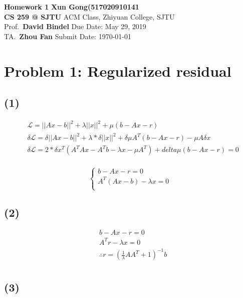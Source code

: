 \documentclass[a4paper]{article}
\begin{document}
\noindent
\large \textbf{Homework 1} \hfill \textbf{Xun Gong(517020910141} \\
\normalsize {\bf CS 259 @ SJTU} \hfill ACM Class, Zhiyuan College, SJTU\\
Prof.~{\bf David Bindel} \hfill Due Date: May 29, 2019\\
TA.~{\bf Zhou Fan} \hfill Submit Date: \today

\section*{Problem 1: Regularized residual}

\subsection*{(1)}

\begin{align*}
&\mathcal{L} = ||Ax - b||^2 + \lambda ||x||^2 + \mu (b - Ax - r) \\
&\delta \mathcal{L} = \delta ||Ax - b||^2 + \lambda * \delta ||x||^2 
                    + \delta \mu A^T (b - Ax - r) - \mu A \delta x \\
&\delta \mathcal{L} = 2*\delta x^T (A^T A x - A^T b - \lambda x - \mu A^T) 
                    + delta \mu (b - Ax - r) = 0\\
\end{align*}

$$\begin{cases}
    b - Ax - r = 0\\
    A^T (Ax - b) - \lambda x = 0 \\
\end{cases}$$

\subsection*{(2)}

\begin{align*}
& b - Ax - r = 0\\
& A^T r - \lambda x = 0 \\
&\therefore r = (\frac{1}{\lambda}A A^T + 1)^{-1} b \\
\end{align*}

\subsection*{(3)}
\end{document}
